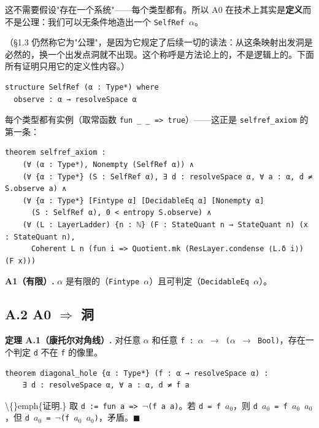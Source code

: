 \documentclass[11pt,a4paper]{ctexart}
\begin{document}
这不需要假设"存在一个系统"——每个类型都有。所以 A0 在技术上其实是\textbf{定义}而不是公理：我们可以无条件地造出一个 \texttt{SelfRef \ensuremath{\alpha}}。

（§1.3 仍然称它为"公理"，是因为它规定了后续一切的读法：从这条映射出发洞是必然的，换一个出发点洞就不出现。这个称呼是方法论上的，不是逻辑上的。下面所有证明只用它的定义性内容。）

\begin{lstlisting}
structure SelfRef (α : Type*) where
  observe : α → resolveSpace α
\end{lstlisting}

每个类型都有实例（取常函数 \texttt{fun \_ \_ => true}）——这正是 \texttt{selfref\_axiom} 的第一条：

\begin{lstlisting}
theorem selfref_axiom :
    (∀ (α : Type*), Nonempty (SelfRef α)) ∧
    (∀ {α : Type*} (S : SelfRef α), ∃ d : resolveSpace α, ∀ a : α, d ≠ S.observe a) ∧
    (∀ {α : Type*} [Fintype α] [DecidableEq α] [Nonempty α]
      (S : SelfRef α), 0 < entropy S.observe) ∧
    (∀ (L : LayerLadder) {n : ℕ} (F : StateQuant n → StateQuant n) (x : StateQuant n),
      Coherent L n (fun i => Quotient.mk (ResLayer.condense ⟨L.δ i⟩) (F x)))
\end{lstlisting}

\textbf{A1（有限）.} \texttt{\ensuremath{\alpha}} 是有限的（\texttt{Fintype \ensuremath{\alpha}}）且可判定（\texttt{DecidableEq \ensuremath{\alpha}}）。

\subsection{A.2 A0 \ensuremath{\Longrightarrow} 洞}

\textbf{定理 A.1（康托尔对角线）.} 对任意 \texttt{\ensuremath{\alpha}} 和任意 \texttt{f : \ensuremath{\alpha} \ensuremath{\to} (\ensuremath{\alpha} \ensuremath{\to} Bool)}，存在一个判定 \texttt{d} 不在 \texttt{f} 的像里。

\begin{lstlisting}
theorem diagonal_hole {α : Type*} (f : α → resolveSpace α) :
    ∃ d : resolveSpace α, ∀ a : α, d ≠ f a
\end{lstlisting}

\textbackslash\{\}emph\{证明.\} 取 \texttt{d := fun a => \ensuremath{\neg}(f a a)}。若 \texttt{d = f \ensuremath{a_{0}}}，则 \texttt{d \ensuremath{a_{0}} = f \ensuremath{a_{0}} \ensuremath{a_{0}}}，但 \texttt{d \ensuremath{a_{0}} = \ensuremath{\neg}(f \ensuremath{a_{0}} \ensuremath{a_{0}})}，矛盾。\ensuremath{\ensuremath{\blacksquare}}
\end{document}
